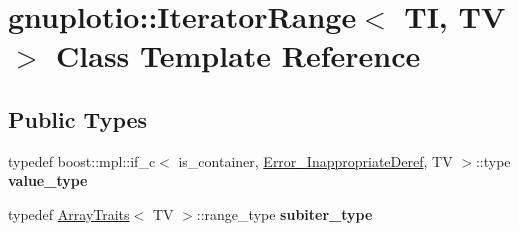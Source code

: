\hypertarget{classgnuplotio_1_1_iterator_range}{}\section{gnuplotio\+:\+:Iterator\+Range$<$ TI, TV $>$ Class Template Reference}
\label{classgnuplotio_1_1_iterator_range}
\subsection*{Public Types}
\begin{DoxyCompactItemize}
\item 
typedef boost\+::mpl\+::if\+\_\+c$<$ is\+\_\+container, \hyperlink{structgnuplotio_1_1_error___inappropriate_deref}{Error\+\_\+\+Inappropriate\+Deref}, TV $>$\+::type {\bfseries value\+\_\+type}\hypertarget{classgnuplotio_1_1_iterator_range_a3d997739282df372a894c586c64a0687}{}\label{classgnuplotio_1_1_iterator_range_a3d997739282df372a894c586c64a0687}

\item 
typedef \hyperlink{classgnuplotio_1_1_array_traits}{Array\+Traits}$<$ TV $>$\+::range\+\_\+type {\bfseries subiter\+\_\+type}\hypertarget{classgnuplotio_1_1_iterator_range_a566ca30462a029f6df4ef16116f99acd}{}\label{classgnuplotio_1_1_iterator_range_a566ca30462a029f6df4ef16116f99acd}

\end{DoxyCompactItemize}
